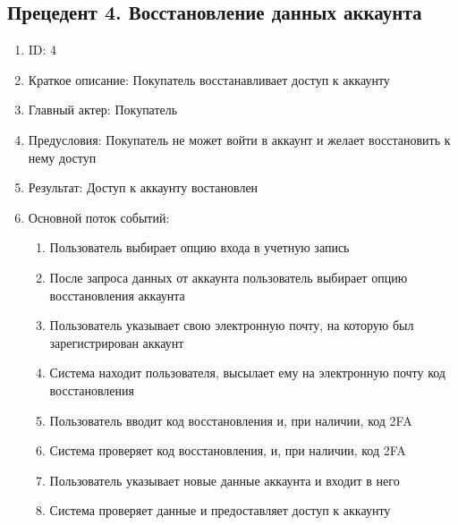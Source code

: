 \documentclass{article}
\begin{document}
\subsection{Прецедент 4. Восстановление данных аккаунта}
\begin{enumerate}
    \item ID: 4
    \item Краткое описание: Покупатель восстанавливает доступ к аккаунту
    \item Главный актер: Покупатель
    \item Предусловия: Покупатель не может войти в аккаунт и желает восстановить к нему доступ
    \item Результат: Доступ к аккаунту востановлен
    \item Основной поток событий:
    \begin{enumerate}
        \item Пользователь выбирает опцию входа в учетную запись 
        \item После запроса данных от аккаунта пользователь выбирает опцию восстановления аккаунта
        \item Пользователь указывает свою электронную почту, на которую был зарегистрирован аккаунт
        \item Система находит пользователя, высылает ему на электронную почту код восстановления
        \item Пользователь вводит код восстановления и, при наличии, код 2FA
        \item Система проверяет код восстановления, и, при наличии, код 2FA
        \item Пользователь указывает новые данные аккаунта и входит в него
        \item Система проверяет данные и предоставляет доступ к аккаунту
    \end{enumerate}
\end{enumerate}
\end{document}
